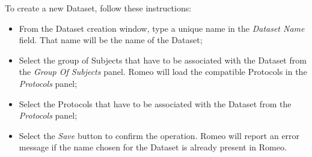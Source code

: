To create a new Dataset\g{}, follow these instructions:
\begin{itemize}
\item From the Dataset\g{} creation window, type a unique name in the \textit{Dataset Name} field. That name will be the name of the Dataset\g{};
\item Select the group of Subjects\g{} that have to be associated with the Dataset\g{} from the \textit{Group Of Subjects} panel. Romeo will load the compatible Protocols\g{} in the \textit{Protocols} panel;
\item Select the Protocols\g{} that have to be associated with the Dataset\g{} from the \textit{Protocols} panel;
\item Select the \textit{Save} button to confirm the operation. Romeo will report an error message if the name chosen for the Dataset{} is already present in Romeo.
\end{itemize}


